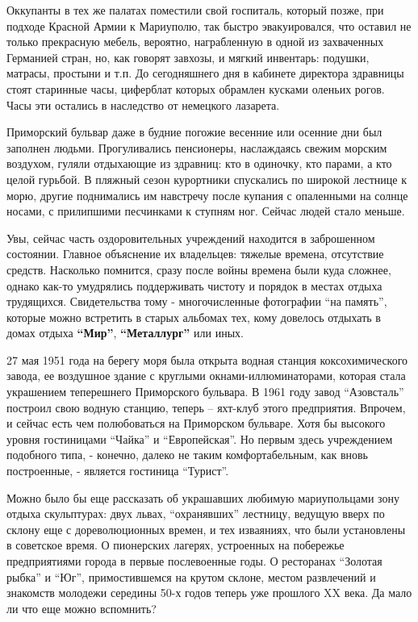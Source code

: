Оккупанты в тех же палатах поместили свой госпиталь, который позже, при подходе
Красной Армии к Мариуполю, так быстро эвакуировался, что оставил не только
прекрасную мебель, вероятно, награбленную в одной из захваченных Германией
стран, но, как говорят завхозы, и мягкий инвентарь: подушки, матрасы, простыни
и т.п. До сегодняшнего дня в кабинете директора здравницы стоят старинные часы,
циферблат которых обрамлен кусками оленьих рогов. Часы эти остались в
наследство от немецкого лазарета.



Приморский бульвар даже в будние погожие весенние или осенние дни был заполнен
людьми. Прогуливались пенсионеры, наслаждаясь свежим морским воздухом, гуляли
отдыхающие из здравниц: кто в одиночку, кто парами, а кто целой гурьбой. В
пляжный сезон курортники спускались по широкой лестнице к морю, другие
поднимались им навстречу после купания с опаленными на солнце носами, с
прилипшими песчинками к ступням ног. Сейчас людей стало меньше.

Увы, сейчас часть оздоровительных учреждений находится в заброшенном состоянии.
Главное объяснение их владельцев: тяжелые времена, отсутствие средств.
Насколько помнится, сразу после войны времена были куда сложнее, однако как-то
умудрялись поддерживать чистоту и порядок в местах отдыха трудящихся.
Свидетельства тому - многочисленные фотографии \enquote{на память}, которые можно
встретить в старых альбомах тех, кому довелось отдыхать в домах отдыха \textbf{\enquote{Мир}},
\textbf{\enquote{Металлург}} или иных.

27 мая 1951 года на берегу моря была открыта водная станция коксохимического
завода, ее воздушное здание с круглыми окнами-иллюминаторами, которая стала
украшением теперешнего Приморского бульвара. В 1961 году завод \enquote{Азовсталь}
построил свою водную станцию, теперь – яхт-клуб этого предприятия. Впрочем, и
сейчас есть чем полюбоваться на Приморском бульваре. Хотя бы высокого уровня
гостиницами \enquote{Чайка} и \enquote{Европейская}. Но первым здесь учреждением подобного
типа, - конечно, далеко не таким комфортабельным, как вновь построенные, -
является гостиница \enquote{Турист}.



Можно было бы еще рассказать об украшавших любимую мариупольцами зону отдыха
скульптурах: двух львах, \enquote{охранявших} лестницу, ведущую вверх по склону еще с
дореволюционных времен, и тех изваяниях, что были установлены в советское
время. О пионерских лагерях, устроенных на побережье предприятиями города в
первые послевоенные годы. О ресторанах \enquote{Золотая рыбка} и \enquote{Юг}, примостившемся
на крутом склоне, местом развлечений и знакомств молодежи середины 50-х годов
теперь уже прошлого ΧΧ века. Да мало ли что еще можно вспомнить?

